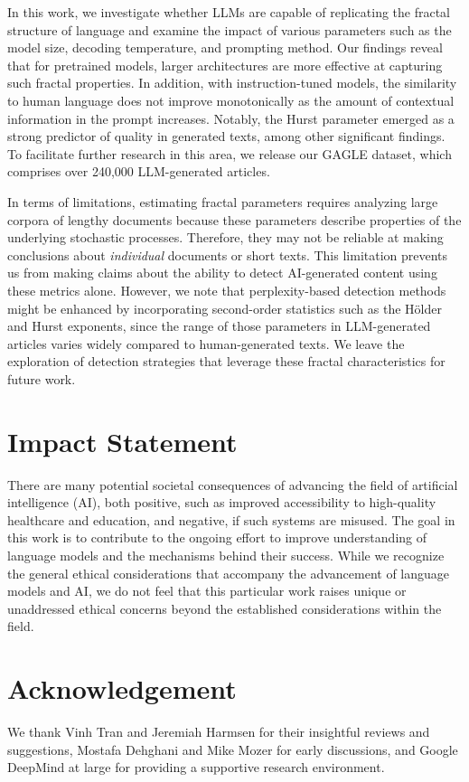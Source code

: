 
In this work, we investigate whether LLMs are capable of replicating the fractal structure of language and examine the impact of various parameters such as the model size, decoding temperature, and prompting method. Our findings reveal that for pretrained models, larger architectures are more effective at capturing such fractal properties. In addition, with instruction-tuned models, the similarity to human language does not improve monotonically as the amount of contextual information in the prompt increases. Notably, the Hurst parameter emerged as a strong predictor of quality in generated texts, among other significant findings. To facilitate further research in this area, we release our GAGLE dataset, which comprises over 240,000 LLM-generated articles.

In terms of limitations, estimating fractal parameters requires analyzing large corpora of lengthy documents because these parameters describe properties of the underlying stochastic processes. Therefore, they may not be reliable at making conclusions about \emph{individual} documents or short texts. This limitation prevents us from making  claims about the ability to detect AI-generated content using these metrics alone. However, we note that perplexity-based detection methods might be enhanced by incorporating second-order statistics such as the H\"older and  Hurst exponents, since the range of those parameters in LLM-generated articles varies widely compared to human-generated texts. We leave the exploration of detection strategies that leverage these fractal characteristics for future work.

\section*{Impact Statement}
There are many potential societal consequences of advancing the field of artificial intelligence (AI), both positive, such as improved accessibility to high-quality healthcare and education, and negative, if such systems are misused. The goal in this work is to contribute to the ongoing effort to improve understanding of language models and the mechanisms behind their success. While we recognize the general ethical considerations that accompany the advancement of language models and AI, we do not feel that this particular work raises unique or unaddressed ethical concerns beyond the established considerations within the field.

\section*{Acknowledgement}
We thank Vinh Tran and Jeremiah Harmsen for their insightful reviews and suggestions, Mostafa Dehghani and Mike Mozer for early discussions, 
and Google DeepMind at large for providing a supportive research environment.